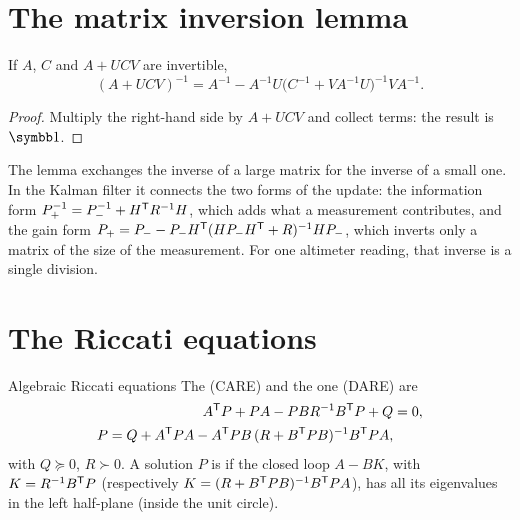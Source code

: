\section{The matrix inversion lemma}

\begin{theorem}
\label{thm:I-woodbury}
If $A$, $C$ and $A + UCV$ are invertible,
\begin{equation}\label{eq:I-woodbury}
  (A + UCV)^{-1} = A^{-1} - A^{-1}U\big(C^{-1} + VA^{-1}U\big)^{-1}VA^{-1} .
\end{equation}
\end{theorem}
\begin{proof}
Multiply the right-hand side by $A + UCV$ and collect terms: the result is $\Id$.
\end{proof}

The lemma exchanges the inverse of a large matrix for the inverse of a small one. In the Kalman filter it connects the two forms of the update: the information form $P^{-1}_+ = P^{-1}_- + H^{\mathsf{T}} R^{-1}H$, which adds what a measurement contributes, and the gain form $P_+ = P_- - P_-H^{\mathsf{T}}(HP_-H^{\mathsf{T}} + R)^{-1}HP_-$, which inverts only a matrix of the size of the measurement. For one altimeter reading, that inverse is a single division.

\section{The Riccati equations}

\begin{definition}{Algebraic Riccati equations}
The  (CARE) and the  one (DARE) are
\begin{align}
  A^{\mathsf{T}} P + PA - PBR^{-1}B^{\mathsf{T}} P + Q &= 0 , \label{eq:I-care}\\
  P = Q + A^{\mathsf{T}} PA - A^{\mathsf{T}} PB\,(R + B^{\mathsf{T}} PB)^{-1}B^{\mathsf{T}} PA , \label{eq:I-dare}
\end{align}
with $Q \succeq 0$, $R \succ 0$. A solution $P$ is  if the closed loop $A - BK$, with $K = R^{-1}B^{\mathsf{T}} P$ (respectively $K = (R + B^{\mathsf{T}} PB)^{-1}B^{\mathsf{T}} PA$), has all its eigenvalues in the left half-plane (inside the unit circle).
\end{definition}

